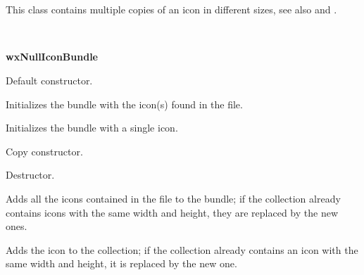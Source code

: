 \section{}\label{wxiconbundle}

This class contains multiple copies of an icon in different sizes,
see also  and
.


\\


{\bf wxNullIconBundle}


\label{wxiconbundlewxiconbundle}


Default constructor.


Initializes the bundle with the icon(s) found in the file.


Initializes the bundle with a single icon.


Copy constructor.

\label{wxiconbundledtor}


Destructor.

\label{wxiconbundleaddicon}


Adds all the icons contained in the file to the bundle;
if the collection already contains icons with the same
width and height, they are replaced by the new ones.


Adds the icon to the collection; if the collection already
contains an icon with the same width and height, it is
replaced by the new one.

